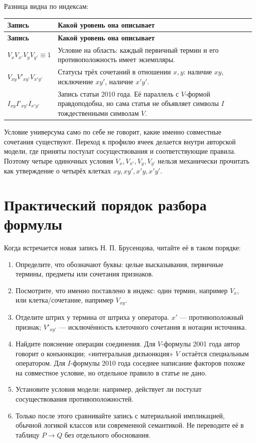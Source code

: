\documentclass[12pt,a4paper]{article}
\begin{document}
Разница видна по индексам:

\begin{longtable}{P{0.39\textwidth}P{0.49\textwidth}}
\toprule
\textbf{Запись} & \textbf{Какой уровень она описывает} \\
\midrule
\endfirsthead
\toprule
\textbf{Запись} & \textbf{Какой уровень она описывает} \\
\midrule
\endhead
$V_xV_{x'}V_yV_{y'}\equiv1$ & Условие на область: каждый первичный термин и его противоположность имеет экземпляры. \\
$V_{xy}V'_{xy'}V_{x'y'}$ & Статусы трёх сочетаний в отношении $x,y$: наличие $xy$, исключение $xy'$, наличие $x'y'$. \\
$I_{xy}I'_{xy'}I_{x'y'}$ & Запись статьи 2010 года. Её параллель с $V$-формой правдоподобна, но сама статья не объявляет символы $I$ тождественными символам $V$. \\
\bottomrule
\end{longtable}

Условие универсума само по себе не говорит, какие именно совместные сочетания существуют. Переход к профилю ячеек делается внутри авторской модели, где приняты постулат сосуществования и соответствующие правила. Поэтому четыре одиночных условия $V_x,V_{x'},V_y,V_{y'}$ нельзя механически прочитать как утверждение о четырёх клетках $xy,xy',x'y,x'y'$.

\section{Практический порядок разбора формулы}

Когда встречается новая запись Н. П. Брусенцова, читайте её в таком порядке:

\begin{enumerate}
\item Определите, что обозначают буквы: целые высказывания, первичные термины, предметы или сочетания признаков.
\item Посмотрите, что именно поставлено в индекс: один термин, например $V_x$, или клетка/сочетание, например $V_{xy}$.
\item Отделите штрих у термина от штриха у оператора. $x'$ — противоположный признак; $V'_{xy'}$ — исключённость клеточного сочетания в нотации источника.
\item Найдите пояснение операции соединения. Для $V$-формулы 2001 года автор говорит о конъюнкции; «интегральная дизъюнкция» $V$ остаётся специальным оператором. Для $I$-формулы 2010 года соседнее написание факторов похоже на совместное условие, но отдельное правило в статье не дано.
\item Установите условия модели: например, действует ли постулат сосуществования противоположностей.
\item Только после этого сравнивайте запись с материальной импликацией, обычной логикой классов или современной семантикой. Не переводите её в таблицу $P\to Q$ без отдельного обоснования.
\end{enumerate}
\end{document}
